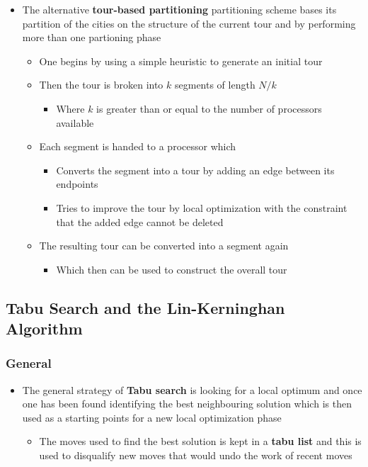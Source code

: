 \documentclass[11pt]{article}
\begin{document}
\begin{itemize}
\item The alternative \textbf{tour-based partitioning} partitioning scheme bases its partition of the cities on the structure of the current tour and by performing more than one partioning phase
\begin{itemize}
\item One begins by using a simple heuristic to generate an initial tour
\item Then the tour is broken into \(k\) segments of length \(N/k\)
\begin{itemize}
\item Where \(k\) is greater than or equal to the number of processors available
\end{itemize}
\item Each segment is handed to a processor which
\begin{itemize}
\item Converts the segment into a tour by adding an edge between its endpoints
\item Tries to improve the tour by local optimization with the constraint that the added edge cannot be deleted
\end{itemize}
\item The resulting tour can be converted into a segment again
\begin{itemize}
\item Which then can be used to construct the overall tour
\end{itemize}
\end{itemize}
\end{itemize}

\subsection{Tabu Search and the Lin-Kerninghan Algorithm}
\label{sec:org8eb857b}
\subsubsection{General}
\label{sec:orgb2b2056}
\begin{itemize}
\item The general strategy of \textbf{Tabu search} is looking for a local optimum and once one has been found identifying the best neighbouring solution which is then used as a starting points for a new local optimization phase
\begin{itemize}
\item The moves used to find the best solution is kept in a \textbf{tabu list} and this is used to disqualify new moves that would undo the work of recent moves
\end{itemize}
\end{itemize}
\end{document}
